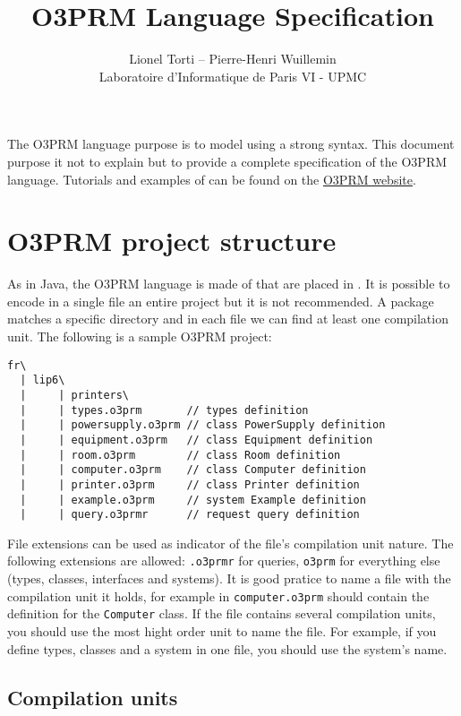 \documentclass[12pt,a4paper]{article}
\title{O3PRM Language Specification}
\author{Lionel Torti -- Pierre-Henri Wuillemin \\ Laboratoire d'Informatique de Paris VI - UPMC}
\begin{document}
\maketitle

The O3PRM language purpose is to model \PRMs{} using a strong \oo{} syntax. This
document purpose it not to explain \PRMs{} but to provide a complete
specification of the O3PRM language. Tutorials and examples of \PRMs{} can be
found on the \href{http://o3prm.lip6.fr/}{O3PRM website}.

{\footnotesize
\tableofcontents
}

\section{O3PRM project structure}

As in Java, the O3PRM language is made of  that are placed
in . It is possible to encode in a single file an entire project but
it is not recommended. A package matches a specific directory and in each file
we can find at least one compilation unit. The following is a sample O3PRM
project:

\begin{small}
\begin{verbatim}
fr\
  | lip6\
  |     | printers\
  |     | types.o3prm       // types definition
  |     | powersupply.o3prm // class PowerSupply definition
  |     | equipment.o3prm   // class Equipment definition
  |     | room.o3prm        // class Room definition
  |     | computer.o3prm    // class Computer definition
  |     | printer.o3prm     // class Printer definition
  |     | example.o3prm     // system Example definition
  |     | query.o3prmr      // request query definition
\end{verbatim}
\end{small}

File extensions can be used as indicator of the file's compilation unit nature.
The following extensions are allowed: \verb+.o3prmr+ for queries,  \verb+o3prm+
for everything else (types, classes, interfaces and systems).  It is good
pratice to name a file with the compilation unit it holds, for example in
\verb+computer.o3prm+ should contain the definition for the \verb+Computer+
class. If the file contains several compilation units, you should use the most
hight order unit to name the file. For example, if you define types, classes
and a system in one file, you should use the system's name.

\subsection{Compilation units}
\end{document}
